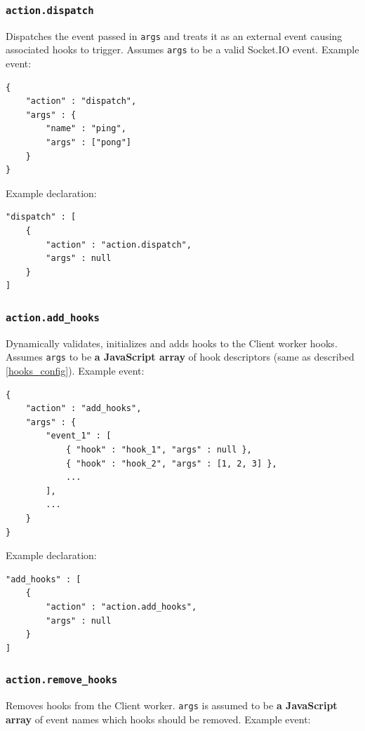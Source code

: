 \documentclass[a4paper]{article}
\begin{document}
\subsubsection{\texttt{action.dispatch}}
\label{sec-8-3-5}

Dispatches the event passed in \texttt{args} and treats it as an external event causing associated hooks to trigger. Assumes \texttt{args} to be a valid Socket.IO event. Example event:

\begin{verbatim}
{
    "action" : "dispatch",
    "args" : {
        "name" : "ping",
        "args" : ["pong"]
    }
}
\end{verbatim}




\noindent
Example declaration:

\begin{verbatim}
"dispatch" : [
    {
        "action" : "action.dispatch",
        "args" : null
    }
]
\end{verbatim}
\subsubsection{\texttt{action.add\_hooks}}
\label{sec-8-3-6}

Dynamically validates, initializes and adds hooks to the Client worker hooks. Assumes \texttt{args} to be \textbf{a JavaScript array} of hook descriptors (same as described \ref{hooks_config}). Example event:

\begin{verbatim}
{
    "action" : "add_hooks",
    "args" : {
        "event_1" : [
            { "hook" : "hook_1", "args" : null },
            { "hook" : "hook_2", "args" : [1, 2, 3] },
            ...
        ],
        ...
    }
}
\end{verbatim}




\noindent
Example declaration:

\begin{verbatim}
"add_hooks" : [
    {
        "action" : "action.add_hooks",
        "args" : null
    }
]
\end{verbatim}
\subsubsection{\texttt{action.remove\_hooks}}
\label{sec-8-3-7}

Removes hooks from the Client worker. \texttt{args} is assumed to be \textbf{a JavaScript array} of event names which hooks should be removed. Example event:
\end{document}
